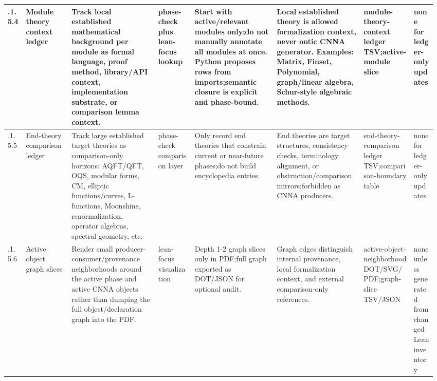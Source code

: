 \begin{longtable}{L{0.042\linewidth} L{0.105\linewidth} L{0.195\linewidth} L{0.08\linewidth} L{0.185\linewidth} L{0.19\linewidth} L{0.118\linewidth} L{0.055\linewidth}}
\hline
{}.1.5.4 & Module theory context ledger & Track local established mathematical background per module as formal language, proof method, library/\allowbreak{}API context, implementation substrate, or comparison lemma context. & phase-check plus lean-focus lookup & Start with active/\allowbreak{}relevant modules only;\newline do not manually annotate all modules at once. Python proposes rows from imports;\newline semantic closure is explicit and phase-bound. & Local established theory is allowed formalization context, never ontic CNNA generator. Examples: Matrix, Finset, Polynomial, graph/\allowbreak{}linear algebra, Schur-style algebraic methods. & module-theory-context ledger TSV;\newline active-module slice & none for ledger-only updates\\
\hline
{}.1.5.5 & End-theory comparison ledger & Track large established target theories as comparison-only horizons: AQFT/\allowbreak{}QFT, OQS, modular forms, CM, elliptic functions/\allowbreak{}curves, L-functions, Moonshine, renormalization, operator algebras, spectral geometry, etc. & phase-check comparison layer & Only record end theories that constrain current or near-future phases;\newline do not build encyclopedia entries. & End theories are target structures, consistency checks, terminology alignment, or obstruction/\allowbreak{}comparison mirrors;\newline forbidden as CNNA producers. & end-theory-comparison ledger TSV;\newline comparison-boundary table & none for ledger-only updates\\
\hline
{}.1.5.6 & Active object graph slices & Render small producer-consumer/\allowbreak{}provenance neighborhoods around the active phase and active CNNA objects rather than dumping the full object/\allowbreak{}declaration graph into the PDF. & lean-focus visualization & Depth 1-2 graph slices only in PDF;\newline full graph exported as DOT/\allowbreak{}JSON for optional audit. & Graph edges distinguish internal provenance, local formalization context, and external comparison-only references. & active-object-neighborhood DOT/\allowbreak{}SVG/\allowbreak{}PDF;\newline graph-slice TSV/\allowbreak{}JSON & none unless generated from changed Lean inventory\\

\end{longtable}
